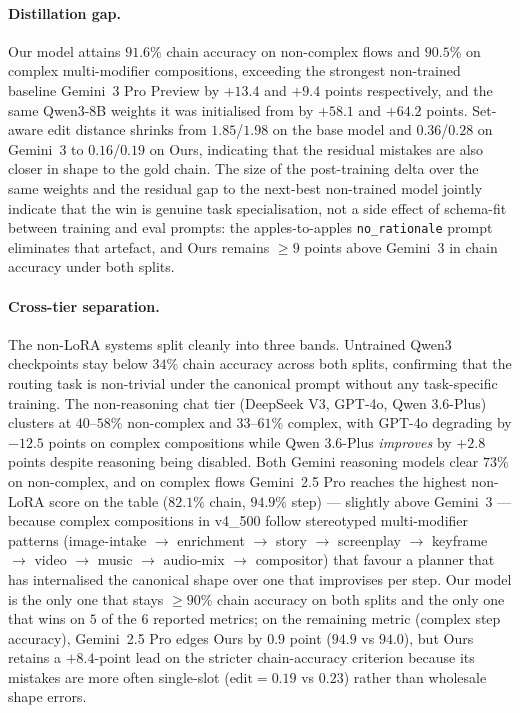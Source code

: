 \paragraph{Distillation gap.}
Our model attains $91.6\%$ chain accuracy on non-complex flows and
$90.5\%$ on complex multi-modifier compositions, exceeding the
strongest non-trained baseline Gemini~3 Pro Preview by $+13.4$ and
$+9.4$ points respectively, and the same Qwen3-8B weights it was
initialised from by $+58.1$ and $+64.2$ points. Set-aware edit
distance shrinks from $1.85$/$1.98$ on the base model and
$0.36$/$0.28$ on Gemini~3 to $0.16$/$0.19$ on Ours, indicating that
the residual mistakes are also closer in shape to the gold chain.
The size of the post-training delta over the same weights and the
residual gap to the next-best non-trained model jointly indicate
that the win is genuine task specialisation, not a side effect of
schema-fit between training and eval prompts: the apples-to-apples
\texttt{no\_rationale} prompt eliminates that artefact, and Ours
remains $\geq\!9$ points above Gemini~3 in chain accuracy under both
splits.

\paragraph{Cross-tier separation.}
The non-LoRA systems split cleanly into three bands. Untrained Qwen3
checkpoints stay below $34\%$ chain accuracy across both splits,
confirming that the routing task is non-trivial under the canonical
prompt without any task-specific training. The non-reasoning chat
tier (DeepSeek V3, GPT-4o, Qwen 3.6-Plus) clusters at $40$--$58\%$
non-complex and $33$--$61\%$ complex, with GPT-4o degrading by
$-12.5$ points on complex compositions while Qwen 3.6-Plus
\emph{improves} by $+2.8$ points despite reasoning being disabled.
Both Gemini reasoning models clear $73\%$ on non-complex, and on
complex flows Gemini~2.5 Pro reaches the highest non-LoRA score on
the table ($82.1\%$ chain, $94.9\%$ step) — slightly above
Gemini~3 — because complex compositions in v4\_500 follow
stereotyped multi-modifier patterns (image-intake $\to$ enrichment
$\to$ story $\to$ screenplay $\to$ keyframe $\to$ video $\to$ music
$\to$ audio-mix $\to$ compositor) that favour a planner that has
internalised the canonical shape over one that improvises per step.
Our model is the only one that stays $\geq\!90\%$ chain accuracy on
both splits and the only one that wins on $5$ of the $6$ reported
metrics; on the remaining metric (complex step accuracy), Gemini~2.5
Pro edges Ours by $0.9$ point ($94.9$ vs $94.0$), but Ours retains a
$+8.4$-point lead on the stricter chain-accuracy criterion because
its mistakes are more often single-slot ($\text{edit}\!=\!0.19$ vs
$0.23$) rather than wholesale shape errors.
